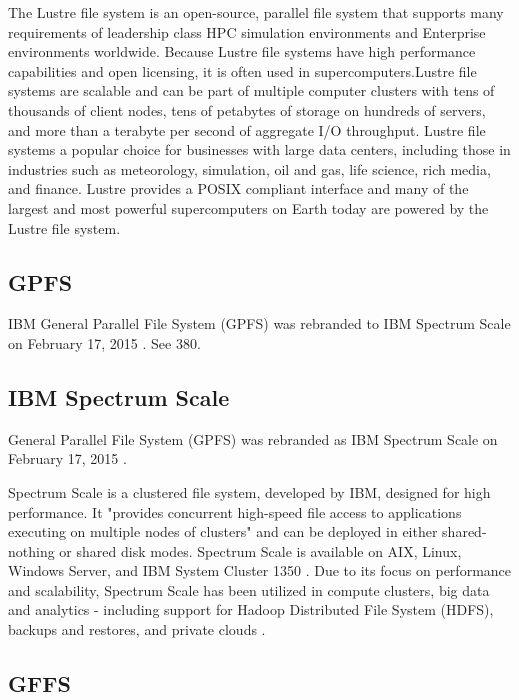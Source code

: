      The Lustre file system \cite{www-lustre} is an open-source,
     parallel file system that supports many requirements of
     leadership class HPC simulation environments and Enterprise
     environments worldwide. Because Lustre file systems have high
     performance capabilities and open licensing, it is often used in
     supercomputers.Lustre file systems are scalable and can be part
     of multiple computer clusters with tens of thousands of client
     nodes, tens of petabytes of storage on hundreds of servers, and
     more than a terabyte per second of aggregate I/O
     throughput. Lustre file systems a popular choice for businesses
     with large data centers, including those in industries such as
     meteorology, simulation, oil and gas, life science, rich media,
     and finance. Lustre provides a POSIX compliant interface and many
     of the largest and most powerful supercomputers on Earth today
     are powered by the Lustre file system.
     
\subsection{ GPFS}

     IBM General Parallel File System (GPFS) was rebranded to IBM 
     Spectrum Scale on February 17, 2015 \cite{www-wikigpfs}.
     See 380.

\subsection{ IBM Spectrum Scale}

     General Parallel File System (GPFS) was rebranded as IBM Spectrum 
     Scale on February 17, 2015 \cite{www-wikigpfs}.

     Spectrum Scale is a clustered file system, developed by IBM,
     designed for high performance. It "provides concurrent high-speed
     file access to applications executing on multiple nodes of
     clusters" \cite{www-wikigpfs} and can be deployed in either
     shared-nothing or shared disk modes. Spectrum Scale is available
     on AIX, Linux, Windows Server, and IBM System Cluster 1350
     \cite{www-wikigpfs}.  Due to its focus on performance and
     scalability, Spectrum Scale has been utilized in compute
     clusters, big data and analytics - including support for Hadoop
     Distributed File System (HDFS), backups and restores, and private
     clouds \cite{www-spectrumscale}.

\subsection{ GFFS}

